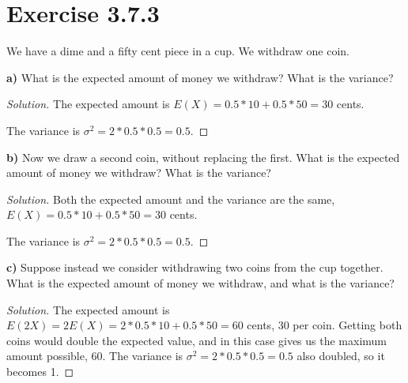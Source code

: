 \documentclass[titlepage, letterpaper, fleqn]{article}
\newcommand{\spacepls}{\vspace{5mm}}
\renewcommand\qedsymbol{\(\blacksquare\)}
\newenvironment{solution}
{\renewcommand\qedsymbol{$\square$}\begin{proof}[Solution]}
{\end{proof}}
\begin{document}
\spacepls

\section{Exercise 3.7.3}

{\large We have a dime and a fifty cent piece in a cup.
We withdraw one coin.

\textbf{a)} What is the expected amount of money we withdraw? What is the variance?}

\begin{solution}
The expected amount is \(E(X) = 0.5 * 10 + 0.5 * 50 = 30\) cents.

The variance is \(\sigma^2 = 2 * 0.5 * 0.5 = 0.5\).
\end{solution}

\spacepls

{\large \textbf{b)} Now we draw a second coin, without replacing the first.
What is the expected amount of money we withdraw? What is the variance?}

\begin{solution}
Both the expected amount and the variance are the same, \(E(X) = 0.5 * 10 + 0.5 * 50 = 30\) cents.

The variance is \(\sigma^2 = 2 * 0.5 * 0.5 = 0.5\).
\end{solution}

\pagebreak

{\large \textbf{c)} Suppose instead we consider withdrawing two coins from the cup together. What is the expected amount of money we withdraw, and what is the variance?}

\begin{solution}
The expected amount is \(E(2X) = 2E(X) = 2 * 0.5 * 10 + 0.5 * 50 = 60\) cents, 30 per coin.
Getting both coins would double the expected value, and in this case gives us the maximum amount possible, 60.
The variance is \(\sigma^2 = 2 * 0.5 * 0.5 = 0.5\) also doubled, so it becomes 1.
\end{solution}
\end{document}
